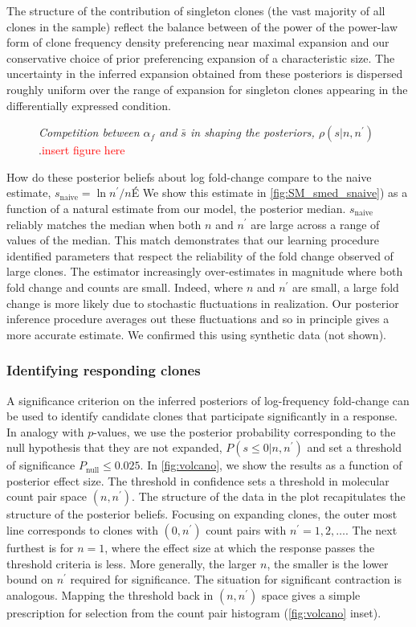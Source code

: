 \documentclass[letterpaper,english,prl,reprint,longbibliography]{revtex4-1} %
\newcommand{\re}[1]{\textcolor{red}{#1}}
\begin{document}
The structure of the contribution of singleton clones (the vast majority of all clones in the sample) reflect the balance between of the power of the power-law form of clone frequency density preferencing near maximal expansion and our conservative choice of prior preferencing expansion of a characteristic size. The uncertainty in the inferred expansion obtained from these posteriors is dispersed roughly uniform over the range of expansion for singleton clones appearing in the differentially expressed condition. 

\begin{figure}[tbph!]

\caption{
\emph{Competition between $\alpha_f$ and $\bar{s}$ in shaping the posteriors, $\rho(s|n,n^\prime)$}.\re{insert figure here} 
\label{fig:posteriors}}
\end{figure}

How do these posterior beliefs about log fold-change compare to the naive estimate, $s_{\textrm{naive}}=\ln n^{\prime}/n$É We show this estimate in \cref{fig:SM_smed_snaive}) as a function of a natural estimate from our model, the posterior median. $s_{\textrm{naive}}$ reliably matches the median when both $n$ and $n^{\prime}$ are large across a range of values of the median. This match demonstrates that our learning procedure identified parameters that respect the reliability of the fold change observed of large clones. The estimator increasingly over-estimates in magnitude where both fold change and counts are small. Indeed, where $n$ and $n^{\prime}$ are small, a large fold change is more likely due to stochastic fluctuations in realization. Our posterior inference procedure averages out these fluctuations and so in principle gives a more accurate estimate. We confirmed this using synthetic data (not shown). 


\subsubsection*{Identifying responding clones}
A significance criterion on the inferred posteriors of log-frequency fold-change can be used to identify candidate clones that participate significantly in a response. In analogy with $p$-values, we use the posterior probability corresponding to the null hypothesis that they are not expanded, $P(s\leq 0|n,n^{\prime})$ and set a threshold of significance $P_{\textrm{null}}\leq 0.025$. In \cref{fig:volcano}, we show the results as a function of posterior effect size. The threshold in confidence sets a threshold in molecular count pair space $(n,n^\prime)$. 
The structure of the data in the plot recapitulates the structure of the posterior beliefs. Focusing on expanding clones, the outer most line corresponds to clones with $(0,n^{\prime})$ count pairs with $n^{\prime}=1,2,\dots$. The next furthest is for $n=1$, where the effect size at which the response passes the threshold criteria is less. More generally, the larger $n$, the smaller is the lower bound on $n^{\prime}$ required for significance. The situation for significant contraction is analogous. Mapping the threshold back in $(n,n^\prime)$ space gives a simple prescription for selection from the count pair histogram (\cref{fig:volcano} inset).
\end{document}
